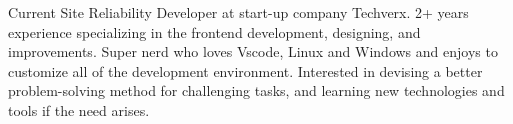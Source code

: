 

\begin{cvparagraph}

Current Site Reliability Developer at start-up company Techverx. 2+ years experience specializing in the frontend development, designing, and improvements. Super nerd who loves Vscode, Linux and Windows and enjoys to customize all of the development environment. Interested in devising a better problem-solving method for challenging tasks, and learning new technologies and tools if the need arises.
\end{cvparagraph}
